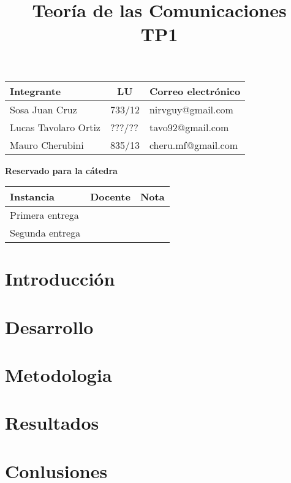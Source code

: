 \documentclass[10pt,a4paper]{article}
\title{Teoría de las Comunicaciones \\ TP1}
\begin{document}

\maketitle

\bigskip

\begin{table}[h]
\centering
\begin{tabular}{|l l l|}
\hline
Integrante       & \multicolumn{1}{c}{LU}     & Correo electrónico        \\ \hline
Sosa Juan Cruz & \multicolumn{1}{c}{733/12} & nirvguy@gmail.com \\ 
Lucas Tavolaro Ortiz & ???/??                      & tavo92@gmail.com \\
Mauro Cherubini & 835/13                      & cheru.mf@gmail.com \\ \hline
\end{tabular}
\end{table}

\vfill

\begin{center}
\textbf{Reservado para la cátedra}
\end{center}
\begin{table}[h]
\centering
\begin{tabular}{|l|l|l|}
\hline
Instancia       & Docente & Nota \\ \hline
Primera entrega &         &      \\ \hline
Segunda entrega &         &      \\ \hline
\end{tabular}
\end{table}

\newpage
\tableofcontents
\newpage


\section{Introducción}


\section{Desarrollo}


\section{Metodologia}


\section{Resultados}


\section{Conlusiones}

\end{document}
